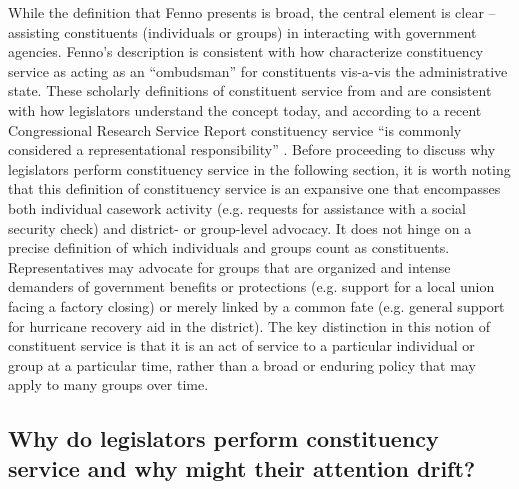 \documentclass{article}
\begin{document}
While the definition that Fenno presents is broad, the central element is clear -- assisting constituents (individuals or groups) in interacting with government agencies.  Fenno's description is consistent with how \citet[pg. 2]{CainFerejohnFiorina1987} characterize constituency service as acting as an ``ombudsman'' for constituents vis-a-vis the administrative state.  These scholarly definitions of constituent service from \citep{Fenno1978} and \citet{CainFerejohnFiorina1987} are consistent with how legislators understand the concept today, and according to a recent Congressional Research Service Report constituency service ``is commonly considered a representational responsibility'' \citep{Eckman2017}.  Before proceeding to discuss why legislators perform constituency service in the following section, it is worth noting that this definition of constituency service is an expansive one that encompasses both individual casework activity (e.g. requests for assistance with a social security check) and district- or group-level advocacy. It does not hinge on a precise definition of which individuals and groups count as constituents. Representatives may advocate for groups that are organized and intense demanders of government benefits or protections (e.g. support for a local union facing a factory closing) or merely linked by a common fate (e.g. general support for hurricane recovery aid in the district). The key distinction in this notion of constituent service is that it is an act of service to a particular individual or group at a particular time, rather than a broad or enduring policy that may apply to many groups over time. 


\subsection{Why do legislators perform constituency service and why might their attention drift?}
\end{document}
